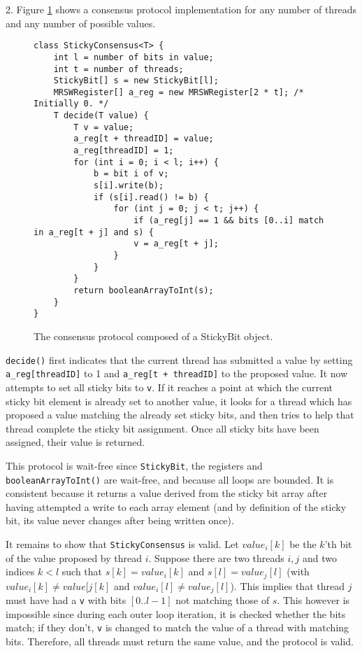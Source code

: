 \documentclass[a4paper,10pt]{article}
\begin{document}
2. Figure \ref{fig:stickyconsensus} shows a consensus protocol implementation for any number of threads and any number of possible values.

\begin{figure}
\begin{lstlisting}
class StickyConsensus<T> {
    int l = number of bits in value;
    int t = number of threads;
    StickyBit[] s = new StickyBit[l];
    MRSWRegister[] a_reg = new MRSWRegister[2 * t]; /* Initially 0. */
    T decide(T value) {
        T v = value;
        a_reg[t + threadID] = value;
        a_reg[threadID] = 1;
        for (int i = 0; i < l; i++) {
            b = bit i of v;
            s[i].write(b);
            if (s[i].read() != b) {
                for (int j = 0; j < t; j++) {
                    if (a_reg[j] == 1 && bits [0..i] match in a_reg[t + j] and s) {
                    v = a_reg[t + j];
                }
            }
        }
        return booleanArrayToInt(s);
    }
}
\end{lstlisting}
\caption{The consensus protocol composed of a StickyBit object.}
\label{fig:stickyconsensus}
\end{figure}

\lstinline|decide()| first indicates that the current thread has submitted a value
by setting \lstinline|a_reg[threadID]| to 1 and \lstinline|a_reg[t + threadID]| to the
proposed value. It now attempts to set all sticky bits to \lstinline|v|. If it reaches
a point at which the current sticky bit element is already set to another value,
it looks for a thread which has proposed a value matching the already set sticky bits,
and then tries to help that thread complete the sticky bit assignment. Once all
sticky bits have been assigned, their value is returned.

This protocol is wait-free since \lstinline|StickyBit|, the registers and
\lstinline|booleanArrayToInt()| are wait-free, and because all loops are
bounded. It is consistent because it returns a value derived from the sticky
bit array after having attempted a write to each array element (and by
definition of the sticky bit, its value never changes after being written
once).

It remains to show that \lstinline|StickyConsensus| is valid. Let $value_i[k]$
be the $k$'th bit of the value proposed by thread $i$. Suppose there are two
threads $i, j$ and two indices $k < l$ such that $s[k] = value_i[k]$ and $s[l]
= value_j[l]$ (with $value_i[k] \neq value[j[k]$ and $value_i[l] \neq
value_j[l]$). This implies that thread $j$ must have had a \lstinline|v| with
bits $[0..l -1]$ not matching those of $s$. This however is impossible since
during each outer loop iteration, it is checked whether the bits match; if they
don't, \lstinline|v| is changed to match the value of a thread with matching
bits. Therefore, all threads must return the same value, and the protocol is valid.
\end{document}
